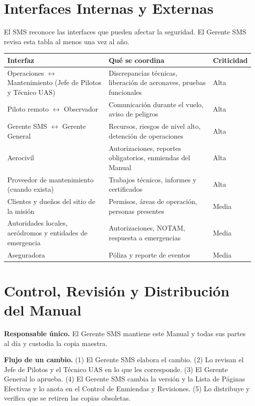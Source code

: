 \section{Interfaces Internas y Externas}
El SMS reconoce las interfaces que pueden afectar la seguridad. El Gerente SMS revisa esta tabla al menos una vez al año.
\begin{longtable}{|>{\RaggedRight\arraybackslash}p{4.4cm}|>{\RaggedRight\arraybackslash}p{6.4cm}|>{\RaggedRight\arraybackslash}p{2.6cm}|}
\hline
\rowcolor[gray]{0.9}\textbf{Interfaz} & \textbf{Qué se coordina} & \textbf{Criticidad} \\ \hline
\endhead
Operaciones $\leftrightarrow$ Mantenimiento (Jefe de Pilotos y Técnico UAS) & Discrepancias técnicas, liberación de aeronaves, pruebas funcionales & Alta \\ \hline
Piloto remoto $\leftrightarrow$ Observador & Comunicación durante el vuelo, aviso de peligros & Alta \\ \hline
Gerente SMS $\leftrightarrow$ Gerente General & Recursos, riesgos de nivel alto, detención de operaciones & Alta \\ \hline
Aerocivil & Autorizaciones, reportes obligatorios, enmiendas del Manual & Alta \\ \hline
Proveedor de mantenimiento (cuando exista) & Trabajos técnicos, informes y certificados & Alta \\ \hline
Clientes y dueños del sitio de la misión & Permisos, áreas de operación, personas presentes & Media \\ \hline
Autoridades locales, aeródromos y entidades de emergencia & Autorizaciones, NOTAM, respuesta a emergencias & Media \\ \hline
Aseguradora & Póliza y reporte de eventos & Media \\ \hline
\end{longtable}

\section{Control, Revisión y Distribución del Manual}
\textbf{Responsable único.} El Gerente SMS mantiene este Manual y todas sus partes al día y custodia la copia maestra.

\textbf{Flujo de un cambio.} (1) El Gerente SMS elabora el cambio. (2) Lo revisan el Jefe de Pilotos y el Técnico UAS en lo que les corresponde. (3) El Gerente General lo aprueba. (4) El Gerente SMS cambia la versión y la Lista de Páginas Efectivas y lo anota en el Control de Enmiendas y Revisiones. (5) Lo distribuye y verifica que se retiren las copias obsoletas.

